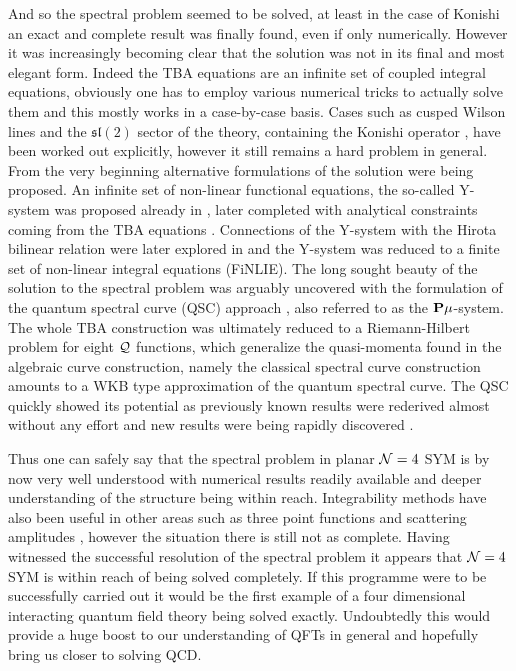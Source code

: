And so the spectral problem seemed to be solved, at least in the case of Konishi an exact and complete result was finally found, even if only numerically.
However it was increasingly becoming clear that the solution was not in its final and most elegant form.
Indeed the TBA equations are an infinite set of coupled integral equations, obviously one has to employ various numerical tricks to actually solve them and this mostly works in a case-by-case basis. 
Cases such as cusped Wilson lines \cite{Correa:2012hh, Gromov:2012eu} and the $\mathfrak{sl}(2)$ sector of the theory, containing the Konishi operator \cite{Gromov:2009bc}, have been worked out explicitly, however it still remains a hard problem in general.
From the very beginning alternative formulations of the solution were being proposed. 
An infinite set of non-linear functional equations, the so-called Y-system was proposed already in \cite{Gromov:2009bc}, later completed with analytical constraints coming from the TBA equations \cite{Cavaglia:2010nm}.
Connections of the \mbox{Y-system} with the Hirota bilinear relation were later explored in \cite{Gromov:2011cx} and the Y-system was reduced to a finite set of non-linear integral equations (FiNLIE).
The long sought beauty of the solution to the spectral problem was arguably uncovered with the formulation of the quantum spectral curve (QSC) approach \cite{Gromov:2013pga,Gromov:2014caa}, also referred to as the ${\bf P}\mu$-system.
The whole TBA construction was ultimately reduced to a Riemann-Hilbert problem for eight $\cal Q$ functions, which generalize the quasi-momenta found in the algebraic curve construction, namely the classical spectral curve construction amounts to a WKB type approximation of the quantum spectral curve.
The QSC quickly showed its potential as previously known results were rederived almost without any effort and new results were being rapidly discovered \cite{Gromov:2013qga, Gromov:2014bva, Alfimov:2014bwa}.

Thus one can safely say that the spectral problem in planar $\mathcal{N}=4$ SYM is by now very well understood with numerical results readily available and deeper understanding of the structure being within reach.
Integrability methods have also been useful in other areas such as three point functions \cite{Escobedo:2010xs, Gromov:2012vu} and scattering amplitudes \cite{Drummond:2010km, Alday:2010kn}, however the situation there is still not as complete.
Having witnessed the successful resolution of the spectral problem it appears that $\mathcal{N}=4$ SYM is within reach of being solved completely.
If this programme were to be successfully carried out it would be the first example of a four dimensional interacting quantum field theory being solved exactly.
Undoubtedly this would provide a huge boost to our understanding of QFTs in general and hopefully bring us closer to solving QCD.

